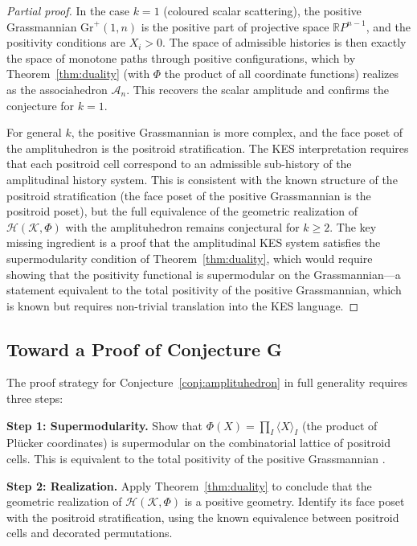 \documentclass[12pt, oneside]{amsart}
\theoremstyle{plain}
\theoremstyle{definition}
\theoremstyle{remark}
\newcommand{\R}{\mathbb{R}}
\newcommand{\Phif}{\Phi}   %
\newcommand{\Assoc}{\mathcal{A}_n}
\begin{document}
\begin{proof}[Partial proof]
In the case $k=1$ (coloured scalar scattering), the positive Grassmannian $\mathrm{Gr}^+(1,n)$ is the positive part of projective space $\R P^{n-1}$, and the positivity conditions are $X_i > 0$. The space of admissible histories is then exactly the space of monotone paths through positive configurations, which by Theorem~\ref{thm:duality} (with $\Phif$ the product of all coordinate functions) realizes as the associahedron $\Assoc$. This recovers the scalar amplitude and confirms the conjecture for $k=1$.

For general $k$, the positive Grassmannian is more complex, and the face poset of the amplituhedron is the positroid stratification. The KES interpretation requires that each positroid cell correspond to an admissible sub-history of the amplitudinal history system. This is consistent with the known structure of the positroid stratification (the face poset of the positive Grassmannian is the positroid poset), but the full equivalence of the geometric realization of $\mathcal{H}(\mathcal{K}, \Phif)$ with the amplituhedron remains conjectural for $k \geq 2$. The key missing ingredient is a proof that the amplitudinal KES system satisfies the supermodularity condition of Theorem~\ref{thm:duality}, which would require showing that the positivity functional is supermodular on the Grassmannian---a statement equivalent to the total positivity of the positive Grassmannian, which is known \cite{Postnikov2006} but requires non-trivial translation into the KES language.
\end{proof}

\subsection{Toward a Proof of Conjecture G}

The proof strategy for Conjecture~\ref{conj:amplituhedron} in full generality requires three steps:

\textbf{Step 1: Supermodularity.} Show that $\Phif(X) = \prod_I \langle X \rangle_I$ (the product of Pl\"{u}cker coordinates) is supermodular on the combinatorial lattice of positroid cells. This is equivalent to the total positivity of the positive Grassmannian \cite{Postnikov2006}.

\textbf{Step 2: Realization.} Apply Theorem~\ref{thm:duality} to conclude that the geometric realization of $\mathcal{H}(\mathcal{K}, \Phif)$ is a positive geometry. Identify its face poset with the positroid stratification, using the known equivalence between positroid cells and decorated permutations.
\end{document}
